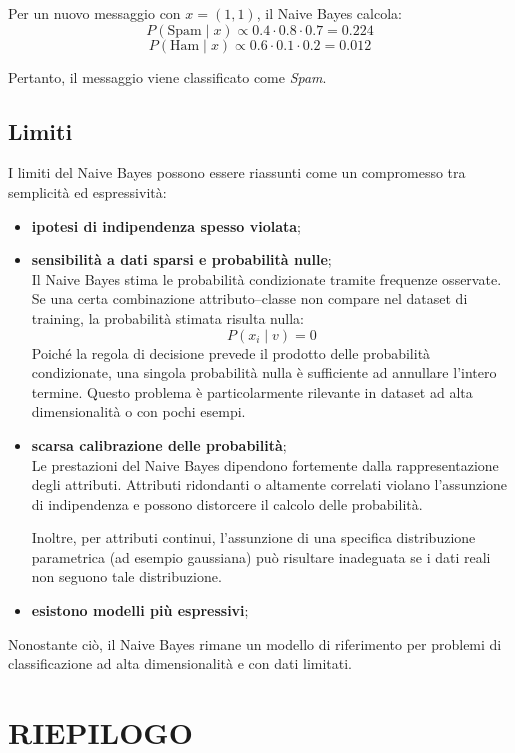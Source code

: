 \documentclass[a4paper,12pt]{report}
\begin{document}
Per un nuovo messaggio con \( x = (1,1) \), il Naive Bayes calcola:
\[
P(\text{Spam} \mid x) \propto 0.4 \cdot 0.8 \cdot 0.7 = 0.224
\]
\[
P(\text{Ham} \mid x) \propto 0.6 \cdot 0.1 \cdot 0.2 = 0.012
\]

Pertanto, il messaggio viene classificato come \textit{Spam}.

\subsection*{Limiti}

I limiti del Naive Bayes possono essere riassunti come un compromesso tra semplicità ed espressività:
\begin{itemize}
    \item \textbf{ipotesi di indipendenza spesso violata};
    \item \textbf{sensibilità a dati sparsi e probabilità nulle}; \\
    Il Naive Bayes stima le probabilità condizionate tramite frequenze osservate.
    Se una certa combinazione attributo--classe non compare nel dataset di training, la probabilità stimata risulta nulla:
    \[
    P(x_i \mid v) = 0
    \]
    Poiché la regola di decisione prevede il prodotto delle probabilità condizionate, una singola probabilità nulla è sufficiente ad annullare l’intero termine.
    Questo problema è particolarmente rilevante in dataset ad alta dimensionalità o con pochi esempi.

    \item \textbf{ scarsa calibrazione delle probabilità}; \\
    Le prestazioni del Naive Bayes dipendono fortemente dalla rappresentazione degli attributi.
    Attributi ridondanti o altamente correlati violano l’assunzione di indipendenza e possono distorcere il calcolo delle probabilità.

    Inoltre, per attributi continui, l’assunzione di una specifica distribuzione parametrica (ad esempio gaussiana) può risultare inadeguata se i dati reali non seguono tale distribuzione.

    \item \textbf{ esistono modelli più espressivi};
    
\end{itemize}

Nonostante ciò, il Naive Bayes rimane un modello di riferimento per problemi di classificazione ad alta dimensionalità e con dati limitati.

\newpage
\section*{RIEPILOGO}
\end{document}
